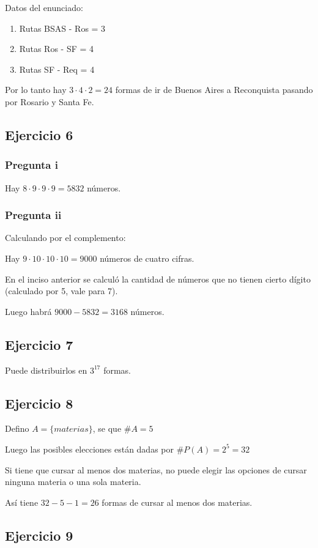 Datos del enunciado:
\begin{enumerate}
    \item Rutas BSAS - Ros = 3
    \item Rutas Ros - SF = 4
    \item Rutas SF - Req = 4
\end{enumerate}

Por lo tanto hay $ 3 \cdot 4 \cdot 2 = 24 $ formas de ir de Buenos Aires a Reconquista pasando por Rosario y Santa Fe.

\subsection{Ejercicio 6}
\subsubsection{Pregunta i}
Hay $ 8 \cdot 9\cdot 9\cdot 9 = 5832 $ números.

\subsubsection{Pregunta ii}
Calculando por el complemento:

Hay $ 9 \cdot 10\cdot 10\cdot 10 = 9000 $ números de cuatro cifras.

En el inciso anterior se calculó la cantidad de números que no tienen cierto dígito (calculado por 5, vale para 7).

Luego habrá $ 9000 - 5832 = 3168 $ números.

\subsection{Ejercicio 7}
Puede distribuirlos en $ 3^{17} $ formas.

\subsection{Ejercicio 8}

Defino $ A = \{ materias \}$, se que $ \#A = 5 $

Luego las posibles elecciones están dadas por $ \#P(A) = 2^5 = 32 $

Si tiene que cursar al menos dos materias, no puede elegir las opciones de cursar ninguna materia o una sola materia.

Así tiene $ 32 - 5 - 1 = 26 $ formas de cursar al menos dos materias.

\subsection{Ejercicio 9}


